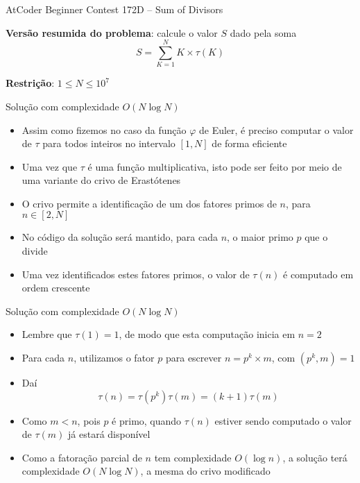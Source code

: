 \begin{frame}[fragile]{AtCoder Beginner Contest 172D -- Sum of Divisors}

    \textbf{Versão resumida do problema}: calcule o valor $S$ dado pela soma
    $$
        S = \sum_{K = 1}^N  K\times \tau(K)
    $$

    \vspace{0.1in}
    \textbf{Restrição}: $1 \leq N \leq 10^7$

\end{frame}

\begin{frame}[fragile]{Solução com complexidade $O(N\log N)$}

    \begin{itemize}
        \item Assim como fizemos no caso da função $\varphi$ de Euler, é preciso computar o valor
            de $\tau$ para todos inteiros no intervalo $[1, N]$ de forma eficiente

        \item Uma vez que $\tau$ é uma função multiplicativa, isto pode ser feito por meio de
            uma variante do crivo de Erastótenes

        \item O crivo permite a identificação de um dos fatores primos de $n$, para $n\in [2, N]$

        \item No código da solução será mantido, para cada $n$, o maior primo $p$ que o divide

        \item Uma vez identificados estes fatores primos, o valor de $\tau(n)$ é computado em
            ordem crescente
    \end{itemize}

\end{frame}

\begin{frame}[fragile]{Solução com complexidade $O(N\log N)$}

    \begin{itemize}
        \item Lembre que $\tau(1) = 1$, de modo que esta computação inicia em $n = 2$

        \item Para cada $n$, utilizamos o fator $p$ para escrever $n = p^k \times m$, com
            $(p^k, m) = 1$

        \item Daí $$\tau(n) = \tau(p^k)\tau(m) = (k + 1)\tau(m)$$

        \item Como $m < n$, pois $p$ é primo, quando $\tau(n)$ estiver sendo computado o valor de
            $\tau(m)$ já estará disponível

        \item Como a fatoração parcial de $n$ tem complexidade $O(\log n)$, a solução terá 
            complexidade $O(N\log N)$, a mesma do crivo modificado
    \end{itemize}

\end{frame}

